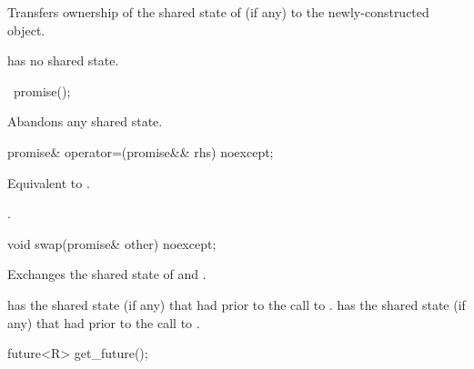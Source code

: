 \begin{itemdescr}
\pnum
\effects
Transfers ownership of the shared state
of  (if any) to the newly-constructed object.

\pnum
\ensures
{} has no shared state.
\end{itemdescr}

%
\begin{itemdecl}
~promise();
\end{itemdecl}

\begin{itemdescr}
\pnum
\effects
Abandons any shared state.
\end{itemdescr}

%
\begin{itemdecl}
promise& operator=(promise&& rhs) noexcept;
\end{itemdecl}

\begin{itemdescr}
\pnum
\effects
Equivalent to
.

\pnum
\returns
{}.
\end{itemdescr}

%
\begin{itemdecl}
void swap(promise& other) noexcept;
\end{itemdecl}

\begin{itemdescr}
\pnum
\effects
Exchanges the shared state of  and .

\pnum
\ensures
{} has the shared state (if any) that  had
prior to the call to .  has the shared state (if any) that
 had prior to the call to .
\end{itemdescr}

%
\begin{itemdecl}
future<R> get_future();
\end{itemdecl}

